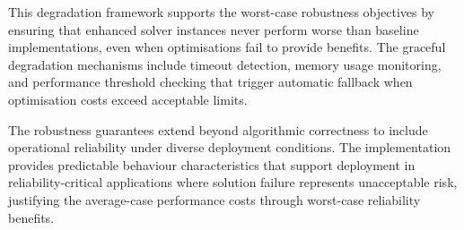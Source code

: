 This degradation framework supports the worst-case robustness objectives by ensuring that enhanced solver instances never perform worse than baseline implementations, even when optimisations fail to provide benefits. The graceful degradation mechanisms include timeout detection, memory usage monitoring, and performance threshold checking that trigger automatic fallback when optimisation costs exceed acceptable limits.

The robustness guarantees extend beyond algorithmic correctness to include operational reliability under diverse deployment conditions. The implementation provides predictable behaviour characteristics that support deployment in reliability-critical applications where solution failure represents unacceptable risk, justifying the average-case performance costs through worst-case reliability benefits.